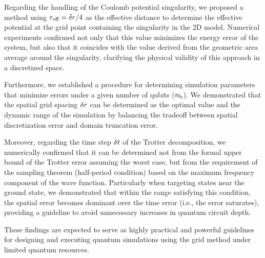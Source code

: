 \documentclass[fontsize=11pt]{article} %
\begin{document}
Regarding the handling of the Coulomb potential singularity, we proposed a
method using $r_{\mathrm{eff}}=\delta r/4$ as the effective distance to determine the
effective potential at the grid point containing the singularity in the 2D
model. Numerical experiments confirmed not only that this value minimizes the
energy error of the system, but also that it coincides with the value derived
from the geometric area average around the singularity, clarifying the physical
validity of this approach in a discretized space.

Furthermore, we established a procedure for determining simulation parameters
that minimize errors under a given number of qubits ($n_{\mathrm{b}}$). We demonstrated
that the spatial grid spacing $\delta r$ can be determined as the optimal value
and the dynamic range of the simulation by balancing the tradeoff between
spatial discretization error and domain truncation error. 

Moreover, regarding the time step $\delta t$ of the Trotter decomposition, we
numerically confirmed that it can be determined not from the formal upper bound
of the Trotter error assuming the worst case, but from the requirement of the
sampling theorem (half-period condition) based on the maximum frequency
component of the wave function. Particularly when targeting states near the
ground state, we demonstrated that within the range satisfying this condition,
the spatial error becomes dominant over the time error (i.e., the error
saturates), providing a guideline to avoid unnecessary increases in quantum
circuit depth.

These findings are expected to serve as highly practical and powerful guidelines
for designing and executing quantum simulations using the grid method under
limited quantum resources.

\printbibliography[heading=bibintoc, title={References}]


\end{document}
